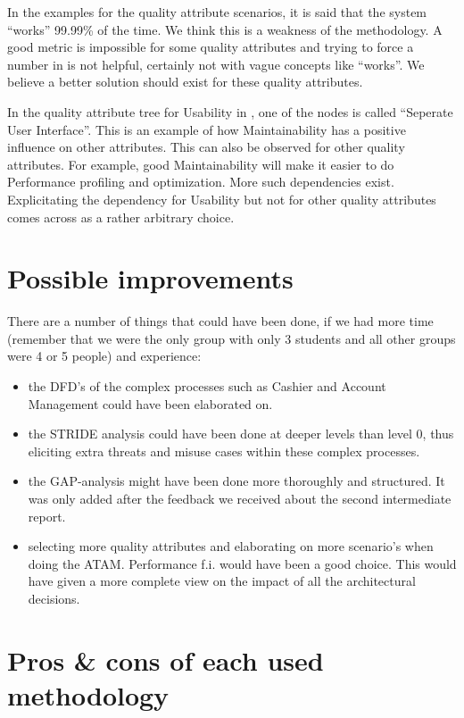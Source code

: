 \documentclass[a4paper,11pt]{report}
\begin{document}
In the examples for the quality attribute scenarios, it is said that the system ``works'' 99.99\% of the time. We think this is a weakness of the methodology. A good metric is impossible for some quality attributes and trying to force a number in is not helpful, certainly not with vague concepts like ``works''. We believe a better solution should exist for these quality attributes.

In the quality attribute tree for Usability in \cite{citeulike:174301}, one of the nodes is called ``Seperate User Interface''. This is an example of how Maintainability has a positive influence on other attributes. This can also be observed for other quality attributes. For example, good Maintainability will make it easier to do Performance profiling and optimization. More such dependencies exist. Explicitating the dependency for Usability but not for other quality attributes comes across as a rather arbitrary choice.
\section{Possible improvements}
There are a number of things that could have been done, if we had more time (remember that we were the only group with only 3 students and all other groups were 4 or 5 people) and experience:
\begin{itemize}
\item the DFD's of the complex processes such as Cashier and Account Management could have been elaborated on.
\item the STRIDE analysis could have been done at deeper levels than level 0, thus eliciting extra threats and misuse cases within these complex processes.
\item the GAP-analysis might have been done more thoroughly and structured. It was only added after the feedback we received about the second intermediate report.
\item selecting more quality attributes and elaborating on more scenario's when doing the ATAM. Performance f.i. would have been a good choice. This would have given a more complete view on the impact of all the architectural decisions.
\end{itemize}
\section{Pros \& cons of each used methodology}
\end{document}
